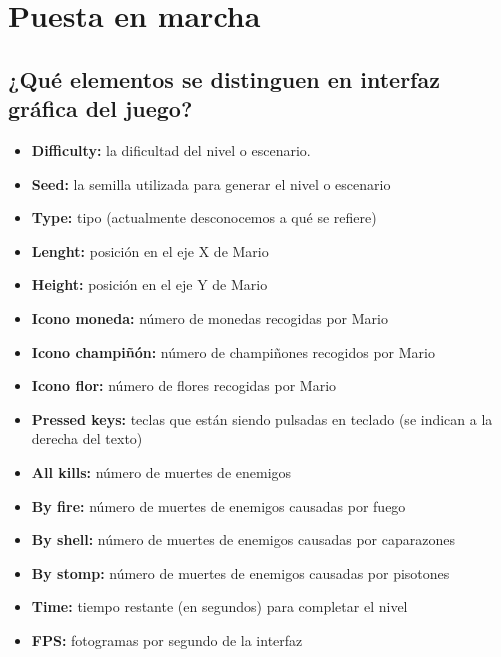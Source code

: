 \documentclass[10pt, spanish, pdftex]{../.memo/plantilla_memorias}
\author{Aitor Alonso Núñez}
\begin{document}
\titleMain

\tableofcontents 	%
\newpage 			%

\section{Puesta en marcha}
\subsection{¿Qué elementos se distinguen en interfaz gráfica del juego?}
\begin{itemize}
    \item \textbf{Difficulty:} la dificultad del nivel o escenario.
    \item \textbf{Seed:} la semilla utilizada para generar el nivel o escenario
    \item \textbf{Type:} tipo (actualmente desconocemos a qué se refiere) %
    \item \textbf{Lenght:} posición en el eje X de Mario
    \item \textbf{Height:} posición en el eje Y de Mario
    \item \textbf{Icono moneda:} número de monedas recogidas por Mario
    \item \textbf{Icono champiñón:} número de champiñones recogidos por Mario
    \item \textbf{Icono flor:} número de flores recogidas por Mario
    \item \textbf{Pressed keys:} teclas que están siendo pulsadas en teclado (se indican a la derecha del texto)
\end{itemize}
\begin{itemize}
    \item \textbf{All kills:} número de muertes de enemigos
    \item \textbf{By fire:} número de muertes de enemigos causadas por fuego
    \item \textbf{By shell:} número de muertes de enemigos causadas por caparazones
    \item \textbf{By stomp:} número de muertes de enemigos causadas por pisotones
    \item \textbf{Time:} tiempo restante (en segundos) para completar el nivel
    \item \textbf{FPS:} fotogramas por segundo de la interfaz
\end{itemize}
\end{document}
